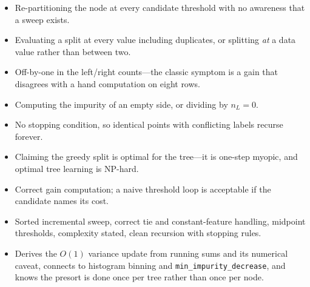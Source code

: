 \begin{interviewq}
\redflags
\begin{itemize}
    \item Re-partitioning the node at every candidate threshold with no awareness that a sweep exists.
    \item Evaluating a split at every value including duplicates, or splitting \emph{at} a data value rather than between two.
    \item Off-by-one in the left/right counts---the classic symptom is a gain that disagrees with a hand computation on eight rows.
    \item Computing the impurity of an empty side, or dividing by $n_L = 0$.
    \item No stopping condition, so identical points with conflicting labels recurse forever.
    \item Claiming the greedy split is optimal for the tree---it is one-step myopic, and optimal tree learning is NP-hard.
\end{itemize}


\goodgreat
\begin{itemize}
    \item {} Correct gain computation; a naive threshold loop is acceptable if the candidate names its cost.
    \item {} Sorted incremental sweep, correct tie and constant-feature handling, midpoint thresholds, complexity stated, clean recursion with stopping rules.
    \item {} Derives the $O(1)$ variance update from running sums and its numerical caveat, connects to histogram binning and \texttt{min\_impurity\_decrease}, and knows the presort is done once per tree rather than once per node.
\end{itemize}

\end{interviewq}

